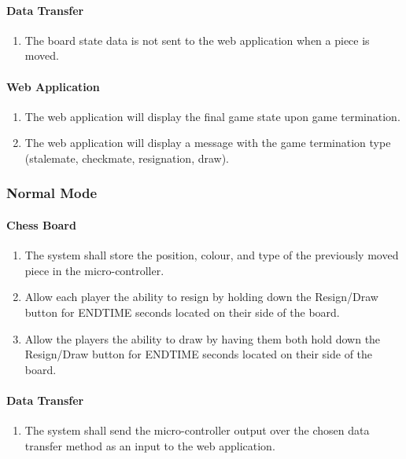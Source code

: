 \documentclass[12pt]{article}
\begin{document}
{\paragraph{Data Transfer}
\begin{enumerate}[{GI}1., leftmargin=2\parindent, resume]
    \item The board state data is not sent to the web application when a piece is moved.
\end{enumerate}

\paragraph{Web Application}
\begin{enumerate}[{GI}1., leftmargin=2\parindent, resume]
    \item The web application will display the final game state upon game termination.
    \item The web application will display a message with the game termination type (stalemate, checkmate, resignation, draw).
\end{enumerate}

\subsubsection{Normal Mode}
\paragraph{Chess Board}
\begin{enumerate}[{NB}1., leftmargin=2\parindent]
    \item The system shall store the position, colour, and type of the previously moved piece in the micro-controller.
    \item Allow each player the ability to resign by holding down the Resign/Draw button for ENDTIME seconds located on their side of the board.
    \item Allow the players the ability to draw by having them both hold down the Resign/Draw button for ENDTIME seconds located on their side of the board. 
\end{enumerate}

\paragraph{Data Transfer}
\begin{enumerate}[{ND}1., leftmargin=2\parindent]
    \item The system shall send the micro-controller output over the chosen data transfer method as an input to the web application.
\end{enumerate}

}
\end{document}
